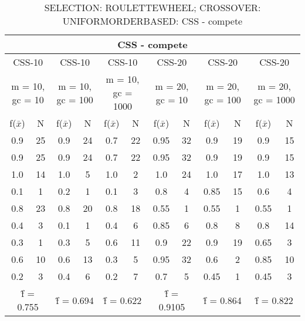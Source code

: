 \begin{table}[H]
	\centering
	\caption{SELECTION: ROULETTEWHEEL; CROSSOVER: UNIFORMORDERBASED: CSS - compete}
	\begin{adjustbox}{width=1\textwidth}
		\begin{tabular}{ |c|c||c|c||c|c||c|c||c|c||c|c| }
			\hline
			\multicolumn{12}{|c|}{CSS - compete} \\
			\hline
			\multicolumn{2}{|c||}{CSS-10} & \multicolumn{2}{c||}{CSS-10} & \multicolumn{2}{c||}{CSS-10} & \multicolumn{2}{c||}{CSS-20} & \multicolumn{2}{c||}{CSS-20} & \multicolumn{2}{c|}{CSS-20}\\
			\hline
			\multicolumn{2}{|c||}{m = 10, gc = 10} & \multicolumn{2}{c||}{m = 10, gc = 100} & \multicolumn{2}{c||}{m = 10, gc = 1000} & \multicolumn{2}{c||}{m = 20, gc = 10} & \multicolumn{2}{c||}{m = 20, gc = 100} & \multicolumn{2}{c|}{m = 20, gc = 1000}\\
			\hline
			f($\bar{x}$) & N & f($\bar{x}$) & N & f($\bar{x}$) & N & f($\bar{x}$) & N & f($\bar{x}$) & N & f($\bar{x}$) & N\\
			\hline
			\hline
			0.9 & 25 & 0.9 & 24 & 0.7 & 22 & 0.95 & 32 & 0.9 & 19 & 0.9 & 15\\
			\hline
			0.9 & 25 & 0.9 & 24 & 0.7 & 22 & 0.95 & 32 & 0.9 & 19 & 0.9 & 15\\
			1.0 & 14 & 1.0 & 5 & 1.0 & 2 & 1.0 & 24 & 1.0 & 17 & 1.0 & 13\\
			0.1 & 1 & 0.2 & 1 & 0.1 & 3 & 0.8 & 4 & 0.85 & 15 & 0.6 & 4\\
			0.8 & 23 & 0.8 & 20 & 0.8 & 18 & 0.55 & 1 & 0.55 & 1 & 0.55 & 1\\
			0.4 & 3 & 0.1 & 1 & 0.4 & 6 & 0.85 & 6 & 0.8 & 8 & 0.8 & 14\\
			0.3 & 1 & 0.3 & 5 & 0.6 & 11 & 0.9 & 22 & 0.9 & 19 & 0.65 & 3\\
			0.6 & 10 & 0.6 & 13 & 0.3 & 5 & 0.95 & 32 & 0.6 & 2 & 0.85 & 10\\
			0.2 & 3 & 0.4 & 6 & 0.2 & 7 & 0.7 & 5 & 0.45 & 1 & 0.45 & 3\\
			\hline
			\multicolumn{2}{|c||}{\^{f} = 0.755} & \multicolumn{2}{c||}{\^{f} = 0.694} & \multicolumn{2}{c||}{\^{f} = 0.622} & \multicolumn{2}{c||}{\^{f} = 0.9105} & \multicolumn{2}{c||}{\^{f} = 0.864} & \multicolumn{2}{c|}{\^{f} = 0.822}\\
			\hline
		\end{tabular}
	\end{adjustbox}
\end{table}
